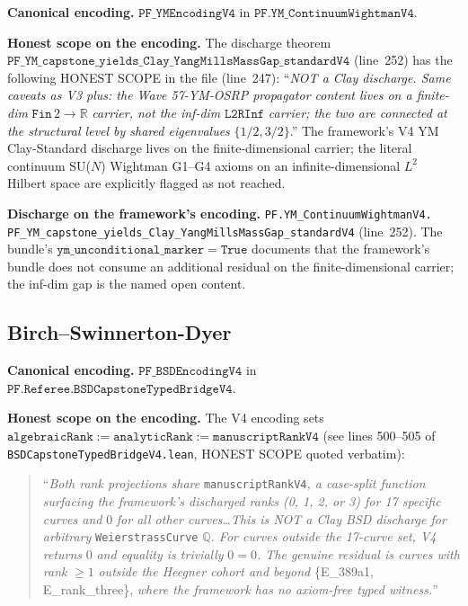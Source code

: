\documentclass[11pt,a4paper]{article}
\theoremstyle{plain}
\theoremstyle{definition}
\begin{document}
\textbf{Canonical encoding.}
$\mathtt{PF\_YMEncodingV4}$ in
$\mathtt{PF.YM\_ContinuumWightmanV4}$.

\textbf{Honest scope on the encoding.} The
discharge theorem $\mathtt{PF\_YM\_capstone\_yields\_Clay\_
YangMillsMassGap\_standardV4}$ (line~252) has the following
HONEST SCOPE in the file (line~247): ``\emph{NOT a Clay
discharge. Same caveats as V3 plus: the Wave 57-YM-OSRP
propagator content lives on a finite-dim} $\mathtt{Fin}\,2 \to
\mathbb{R}$ \emph{carrier, not the inf-dim} $\mathtt{L2RInf}$
\emph{carrier; the two are connected at the structural level by
shared eigenvalues} $\{1/2, 3/2\}$.'' The framework's V4 YM
Clay-Standard discharge lives on the finite-dimensional carrier;
the literal continuum SU($N$) Wightman G1--G4 axioms on an
infinite-dimensional $L^{2}$ Hilbert space are explicitly flagged
as not reached.

\textbf{Discharge on the framework's encoding.}
\texttt{PF.YM\_ContinuumWightmanV4.\\
PF\_YM\_capstone\_yields\_Clay\_YangMillsMassGap\_standardV4}
(line~252). The bundle's $\mathtt{ym\_unconditional\_marker} =
\mathtt{True}$ documents that the framework's bundle does not
consume an additional residual on the finite-dimensional carrier;
the inf-dim gap is the named open content.

\subsection{Birch--Swinnerton-Dyer}
\label{sec:bsd}
\label{sec:bsd-honest}

\textbf{Canonical encoding.}
$\mathtt{PF\_BSDEncodingV4}$ in
$\mathtt{PF.Referee.BSDCapstoneTypedBridgeV4}$.

\textbf{Honest scope on the encoding.} The V4 encoding sets
$\mathtt{algebraicRank := analyticRank := manuscriptRankV4}$
(see lines 500--505 of
\texttt{BSDCapstoneTypedBridgeV4.lean}, HONEST SCOPE quoted
verbatim):
\begin{quote}
``\emph{Both rank projections share} \texttt{manuscriptRankV4}\emph{,
a case-split function surfacing the framework's discharged ranks
(0, 1, 2, or 3) for 17 specific curves and} 0 \emph{for all other
curves\ldots This is NOT a Clay BSD discharge for arbitrary}
\texttt{WeierstrassCurve} $\mathbb{Q}$\emph{. For curves outside
the 17-curve set, V4 returns} 0 \emph{and equality is trivially}
$0 = 0$\emph{. The genuine residual is curves with rank} $\geq
1$ \emph{outside the Heegner cohort and beyond} \{E\_389a1,
E\_rank\_three\}, \emph{where the framework has no axiom-free
typed witness.}''
\end{quote}
\end{document}
